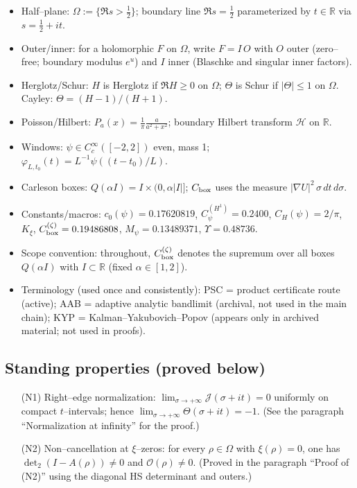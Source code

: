 \documentclass[11pt]{article}
\providecommand{\czeroplateau}{0.17620819}%
\providecommand{\CboxZeta}{K_0 + K_\xi}%
\providecommand{\CHone}{2/\pi}%
\newcommand{\Hilb}{\mathcal H}
\providecommand{\CpsiHone}{0.2400}%
\providecommand{\Mpsilocked}{(4/\pi)\,\CpsiHone\,\sqrt{\CboxZeta}}
\providecommand{\UpsilonLocked}{(2/\pi)\,\Mpsilocked/\czeroplateau}%
\renewcommand{\CboxZeta}{0.19486808}
\renewcommand{\Mpsilocked}{0.13489371}
\renewcommand{\UpsilonLocked}{0.48736}
\theoremstyle{definition}
\theoremstyle{remark}
\newcommand{\R}{\mathbb{R}}
\begin{document}
\begin{itemize}
\item Half–plane: $\Omega:=\{\Re s>\tfrac12\}$; boundary line $\Re s=\tfrac12$ parameterized by $t\in\R$ via $s=\tfrac12+it$.
\item Outer/inner: for a holomorphic $F$ on $\Omega$, write $F=I\,O$ with $O$ outer (zero–free; boundary modulus $e^{u}$) and $I$ inner (Blaschke and singular inner factors).
\item Herglotz/Schur: $H$ is Herglotz if $\Re H\ge 0$ on $\Omega$; $\Theta$ is Schur if $|\Theta|\le 1$ on $\Omega$. Cayley: $\Theta=(H-1)/(H+1)$.
\item Poisson/Hilbert: $P_a(x)=\tfrac{1}{\pi}\tfrac{a}{a^2+x^2}$; boundary Hilbert transform $\Hilb$ on $\R$.
\item Windows: $\psi\in C_c^\infty([-2,2])$ even, mass 1; $\varphi_{L,t_0}(t)=L^{-1}\psi((t-t_0)/L)$.
\item Carleson boxes: $Q(\alpha I)=I\times(0,\alpha|I|]$; $C_{\rm box}$ uses the measure $|\nabla U|^2\,\sigma\,dt\,d\sigma$.
\item Constants/macros: $c_0(\psi)=\czeroplateau$, $C_\psi^{(H^1)}=\CpsiHone$, $C_H(\psi)=\CHone$, $K_\xi$, $C_{\rm box}^{(\zeta)}=\CboxZeta$, $M_\psi=\Mpsilocked$, $\Upsilon=\UpsilonLocked$.
\item Scope convention: throughout, $C_{\rm box}^{(\zeta)}$ denotes the supremum over all boxes $Q(\alpha I)$ with $I\subset\mathbb R$ (fixed $\alpha\in[1,2]$).
\item Terminology (used once and consistently): PSC = product certificate route (active); AAB = adaptive analytic bandlimit (archival, not used in the main chain); KYP = Kalman–Yakubovich–Popov (appears only in archived material; not used in proofs).
\end{itemize}


\vspace{1.0cm}
\subsection*{Standing properties (proved below)}\label{sec:standing-assumptions}
\begin{itemize}
\item[(N1)] Right--edge normalization: $\displaystyle \lim_{\sigma\to+\infty}\mathcal J(\sigma+it)=0$ uniformly on compact $t$--intervals; hence $\lim_{\sigma\to+\infty}\Theta(\sigma+it)=-1$. (See the paragraph ``Normalization at infinity'' for the proof.)
\item[(N2)] Non--cancellation at $\xi$--zeros: for every $\rho\in\Omega$ with $\xi(\rho)=0$, one has $\det_2(I-A(\rho))\ne 0$ and $\mathcal O(\rho)\ne 0$. (Proved in the paragraph ``Proof of (N2)'' using the diagonal HS determinant and outers.)
\end{itemize}
\end{document}
